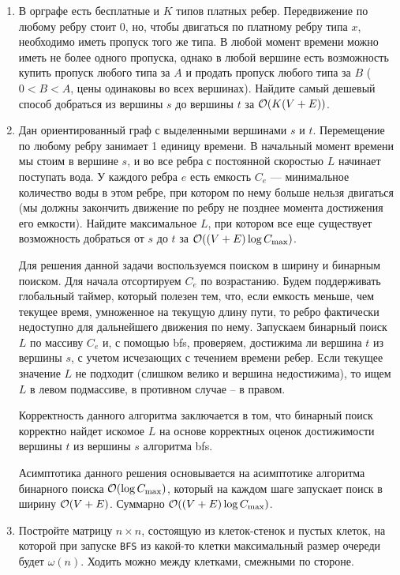 \begin{enumerate}
  \item
    В орграфе есть бесплатные и $K$ типов платных ребер. Передвижение
    по любому ребру стоит $0$, но, чтобы двигаться по платному ребру
    типа $x$, необходимо иметь пропуск того же типа. В любой момент
    времени можно иметь не более одного пропуска, однако в любой
    вершине есть возможность купить пропуск любого типа за $A$ и
    продать пропуск любого типа за $B$ ($0 < B < A$, цены одинаковы
    во всех вершинах). Найдите самый дешевый способ добраться из вершины
    $s$ до вершины $t$ за $\mathcal{O}(K (V + E))$.

  \item
    Дан ориентированный граф с выделенными вершинами $s$ и $t$. Перемещение по любому ребру занимает 1 единицу времени.
    В начальный момент времени мы стоим в вершине $s$, и во все ребра с постоянной скоростью $L$ начинает поступать вода.
    У каждого ребра $e$ есть емкость $C_e$ --- минимальное количество воды в этом ребре, при котором по нему больше
    нельзя двигаться (мы должны закончить движение по ребру не позднее момента достижения его емкости). Найдите
    максимальное $L$, при котором все еще существует возможность добраться от $s$ до $t$ за $\mathcal{O}((V + E)\log{C_{\max}})$.
    \begin{solution}
      Для решения данной задачи воспользуемся поиском в ширину и бинарным поиском. Для начала отсортируем $C_e$ по возрастанию. Будем поддерживать глобальный таймер, который полезен тем, что, если емкость меньше, чем текущее время, умноженное на текущую длину пути, то ребро фактически недоступно для дальнейшего движения по нему. Запускаем бинарный поиск $L$ по массиву $C_e$ и, с помощью bfs, проверяем, достижима ли вершина $t$ из вершины $s$, с учетом исчезающих с течением времени ребер. Если текущее значение $L$ не подходит (слишком велико и вершина недостижима), то ищем $L$ в левом подмассиве, в противном случае -- в правом.

      Корректность данного алгоритма заключается в том, что бинарный поиск корректно найдет искомое $L$ на основе корректных оценок достижимости вершины $t$ из вершины $s$ алгоритма bfs.

      Асимптотика данного решения основывается на асимптотике алгоритма бинарного поиска $\mathcal{O}(\log{C_{\max}})$, который на каждом шаге запускает поиск в ширину $\mathcal{O}(V + E)$. Суммарно $\mathcal{O}((V + E)\log{C_{\max}})$.
    \end{solution}

  \item
    Постройте матрицу $n \times n$, состоящую из клеток-стенок и пустых клеток,
    на которой при запуске \texttt{BFS} из какой-то клетки максимальный
    размер очереди будет $\omega(n)$. Ходить можно между клетками, смежными по стороне.


\end{enumerate}
